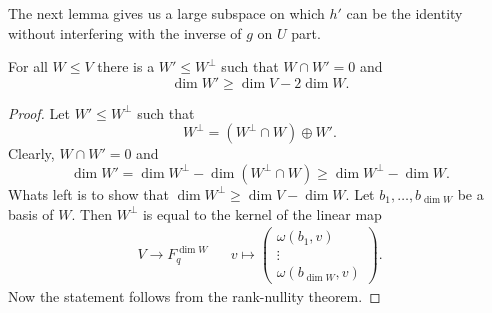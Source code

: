 The next lemma gives us a large subspace on which $h'$ can be the identity without interfering with the inverse of $g$ on $U$ part.

\begin{lemma}\label{lem:largeOrthogonal}
For all $W\leq V$ there is a $W'\leq W^\bot$ such that $W\cap W'=0$ and \[\dim W'\geq \dim V-2\dim W.\]
\end{lemma}
\begin{proof}
Let $W'\leq W^\bot$ such that 
\[W^\bot=(W^\bot\cap W)\oplus W'.\]
Clearly, $W\cap W'=0$ and 
\[\dim W'=\dim W^\bot - \dim (W^\bot\cap W)\geq \dim W^\bot- \dim W.\]
Whats left is to show that $\dim W^\bot\geq \dim V-\dim W$. Let $b_1,\dots, b_{\dim W}$ be a basis of $W$. Then $W^\bot$ is equal to the kernel of the linear map 
\begin{align*}
V\to F_q^{\dim W}&& v\mapsto
\begin{pmatrix}
\omega(b_1,v)\\
\vdots\\
\omega(b_{\dim W},v)
\end{pmatrix}.
\end{align*}
Now the statement follows from the rank-nullity theorem.
\end{proof}



